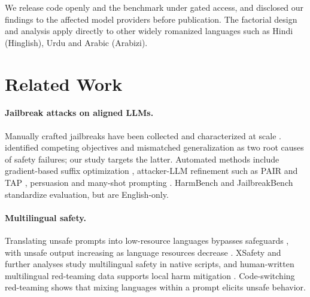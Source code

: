 We release code openly and the benchmark under gated access, and disclosed
our findings to the affected model providers before publication. The
factorial design and analysis apply directly to other widely romanized
languages such as Hindi (Hinglish), Urdu and Arabic (Arabizi).

\section{Related Work}

\paragraph{Jailbreak attacks on aligned LLMs.}
Manually crafted jailbreaks have been collected and characterized at scale
\citep{shen2024anything}. \citet{wei2023jailbroken} identified competing
objectives and mismatched generalization as two root causes of safety
failures; our study targets the latter. Automated methods include
gradient-based suffix optimization \citep{zou2023universal}, attacker-LLM
refinement such as PAIR \citep{chao2023jailbreaking} and TAP
\citep{mehrotra2024tree}, persuasion \citep{zeng2024johnny} and many-shot
prompting \citep{anil2024manyshot}. HarmBench \citep{mazeika2024harmbench}
and JailbreakBench \citep{chao2024jailbreakbench} standardize evaluation,
but are English-only.

\paragraph{Multilingual safety.}
Translating unsafe prompts into low-resource languages bypasses safeguards
\citep{yong2023lowresource}, with unsafe output increasing as language
resources decrease \citep{deng2024multilingual}. XSafety
\citep{wang2024languages} and further analyses \citep{shen2024language}
study multilingual safety in native scripts, and human-written multilingual
red-teaming data supports local harm mitigation
\citep{aakanksha2024multilingual}. Code-switching red-teaming
\citep{yoo2024codeswitching} shows that mixing languages within a prompt
elicits unsafe behavior.

